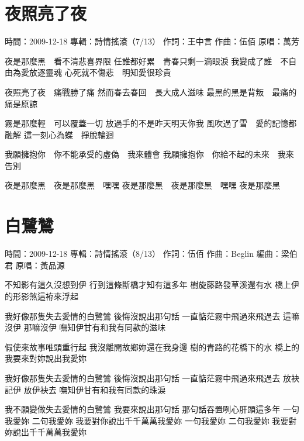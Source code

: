 \documentclass[UTF8,a4paper,oneside,twocolumn,12pt]{ctexbook}
\newcommand{\infopair}[2]{\textbullet #1：#2}
\newcommand{\zc}[1][伍佰]{\infopair{作詞}{#1}}
\newcommand{\zq}[1][伍佰]{\infopair{作曲}{#1}}
\newcommand{\bq}[1][伍佰]{\infopair{編曲}{#1}}
\newcommand{\zj}[1]{\infopair{專輯}{#1}}
\newcommand{\yc}[1]{\infopair{原唱}{#1}}
\newcommand{\sj}[1]{\infopair{時間}{#1}}
\newenvironment{info}{\begin{flushleft}\kaishu
	}
	{\end{flushleft}\normalsize\yahei\par}
\newenvironment{lyric}{
	}
{}
\begin{document}
\section{夜照亮了夜}
\begin{info}
	\sj{2009-12-18}
	\zj{詩情搖滾（7/13）}
	\zc[王中言]
	\zq
	\yc{萬芳}
\end{info}
\begin{lyric}
	夜是那麼黑　看不清悲喜界限
	任誰都好累　青春只剩一滴眼淚
	我變成了誰　不自由為愛放逐靈魂
	心死就不傷悲　明知愛很珍貴

	夜照亮了夜　痛戰勝了痛
	然而春去春回　長大成人滋味
	最黑的黑是背叛　最痛的痛是原諒

	霧是那麼輕　可以覆蓋一切
	放過手的不是昨天明天你我
	風吹過了雪　愛的記憶都融解
	這一刻心為蝶　掙脫輪迴

	我願擁抱你　你不能承受的虛偽　我來體會
	我願擁抱你　你給不起的未來　我來告別

	夜是那麼黑　夜是那麼黑　嘿嘿
	夜是那麼黑　夜是那麼黑　嘿嘿
	夜是那麼黑
\end{lyric}

\section{白鷺鷥}
\begin{info}
	\sj{2009-12-18}
	\zj{詩情搖滾（8/13）}
	\zc
	\zq[Beglin]
	\bq[梁伯君]
	\yc{黃品源}
\end{info}
\begin{lyric}
	不知影有這久沒想到伊 行到這條斷橋才知有這多年
	樹旋藤路發草溪還有水 橋上伊的形影煞這袸來浮起

	我好像那隻失去愛情的白鷺鷥 後悔沒說出那句話
	一直惦茫霧中飛過來飛過去 這嘛沒伊 那嘛沒伊
	嘸知伊甘有和我有同款的滋味

	假使來故事唯頭重行起 我沒離開故鄉妳還在我身邊
	樹的青路的花橋下的水 橋上的我要來對妳說出我愛妳

	我好像那隻失去愛情的白鷺鷥 後悔沒說出那句話
	一直惦茫霧中飛過來飛過去 放袂記伊 放伊袂去
	嘸知伊甘有和我有同款的珠淚

	我不願變做失去愛情的白鷺鷥 我要來說出那句話
	那句話吞置咧心肝頭這多年
	一句我愛妳 二句我愛妳 我要對你說出千千萬萬我愛妳
	一句我愛妳 二句我愛妳 我要對妳說出千千萬萬我愛妳
\end{lyric}
\end{document}
